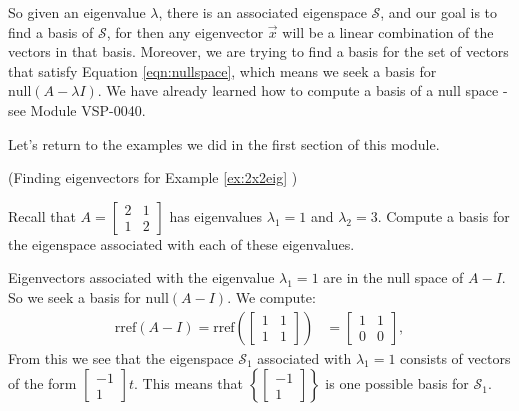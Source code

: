\documentclass{ximera}
\begin{document}
So given an eigenvalue $\lambda$, there is an associated eigenspace $\mathcal{S}$, and our goal is to find a basis of $\mathcal{S}$, for then any eigenvector $\vec{x}$ will be a linear combination of the vectors in that basis.  Moreover, we are trying to find a basis for the set of vectors that satisfy Equation \ref{eqn:nullspace}, which means we seek a basis for $\mbox{null}(A-\lambda I)$.  We have already learned how to compute a basis of a null space - see Module VSP-0040.

Let's return to the examples we did in the first section of this module.

\begin{example}\label{ex:eigvect2x2eig} (Finding eigenvectors for Example \ref{ex:2x2eig} ) 

Recall that $A=\begin{bmatrix} 2& 1\\ 1&2
\end{bmatrix}$ has eigenvalues $\lambda_1=1$ and $\lambda_2=3$.  Compute a basis for the eigenspace associated with each of these eigenvalues.
\begin{explanation}
Eigenvectors associated with the eigenvalue $\lambda_1=1$ are in the null space of $A-I$.  So we seek a basis for $\mbox{null}(A-I)$.  We compute:
\begin{align*}\mbox{rref}(A-I)=\mbox{rref}\left(\begin{bmatrix}1&1\\1&1\end{bmatrix}\right)&=\begin{bmatrix}1&1\\0&0\end{bmatrix},
\end{align*}
From this we see that the eigenspace $\mathcal{S}_1$ associated with $\lambda_1=1$ consists of vectors of the form $\begin{bmatrix}-1\\1\end{bmatrix}t$.
This means that $\left\{\begin{bmatrix}-1\\1\end{bmatrix}\right\}$ is one possible basis for $\mathcal{S}_1$.


\end{explanation}
\end{example}
\end{document}
